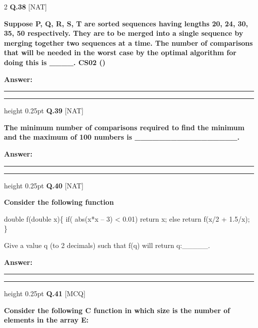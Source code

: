 \documentclass[a4paper,10pt,twoside]{article}
\begin{document}
\begin{multicols}{2}
\noindent\textbf{Q.38} \hfill {\footnotesize\textsf{[NAT]}}
\par\vspace{2pt}
{\bfseries Suppose P, Q, R, S, T are sorted sequences having lengths 20, 24, 30, 35, 50 respectively. They are
to be merged into a single sequence by merging together two sequences at a time. The number of
comparisons that will be needed in the worst case by the optimal algorithm for doing this is \_\_\_\_.
CS02 () \par}
\par\vspace{3pt}\noindent\textbf{Answer:} \rule{3.2cm}{0.4pt}
\par\vspace{6pt}\hrule height 0.25pt\vspace{6pt}
\noindent\textbf{Q.39} \hfill {\footnotesize\textsf{[NAT]}}
\par\vspace{2pt}
{\bfseries The minimum number of comparisons required to find the minimum and the maximum of 100
numbers is \_\_\_\_\_\_\_\_\_\_\_\_\_\_\_\_\_. \par}
\par\vspace{3pt}\noindent\textbf{Answer:} \rule{3.2cm}{0.4pt}
\par\vspace{6pt}\hrule height 0.25pt\vspace{6pt}
\noindent\textbf{Q.40} \hfill {\footnotesize\textsf{[NAT]}}
\par\vspace{2pt}
{\bfseries Consider the following function
\par\smallskip
double f(double x)\{
if( abs(x*x -- 3) < 0.01) return x;
else return f(x/2 + 1.5/x);
\}
\par\smallskip
Give a value q (to 2 decimals) such that f(q) will return q:\_\_\_\_\_. \par}
\par\vspace{3pt}\noindent\textbf{Answer:} \rule{3.2cm}{0.4pt}
\par\vspace{6pt}\hrule height 0.25pt\vspace{6pt}
\noindent\textbf{Q.41} \hfill {\footnotesize\textsf{[MCQ]}}
\par\vspace{2pt}
{\bfseries Consider the following C function in which size is the number of elements in the array E:
\par\smallskip
}
\end{multicols}
\end{document}
